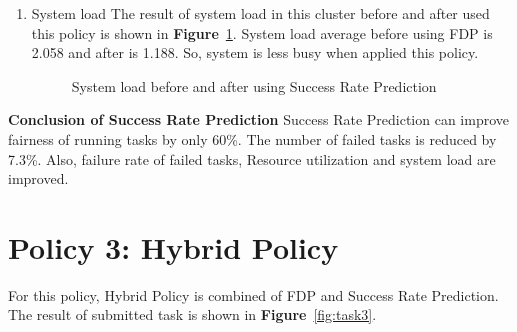 \documentclass[12pt,oneside,openright,a4paper]{cpe-english-project}
\begin{document}
\begin{enumerate}
\newpage
  \item System load
  \newline
  The result of system load in this cluster before and after used this policy is shown in \textbf{Figure}~\ref{fig:load2}. System load average before using FDP is 2.058 and after is 1.188. So, system is less busy when applied this policy.
\begin{figure}[!h]\centering
    \setlength{\fboxrule}{0mm} %
    \setlength{\fboxsep}{0cm}
    \caption{System load before and after using Success Rate Prediction}\label{fig:load2}
\end{figure}
\end{enumerate}
\textbf{Conclusion of Success Rate Prediction}
\newline
\hspace{10mm}Success Rate Prediction can improve fairness of running tasks by only 60\%. The number of failed tasks is reduced by 7.3\%. Also, failure rate of failed tasks, Resource utilization and system load are improved.


\section{Policy 3: Hybrid Policy}  
\hspace{10mm}For this policy, Hybrid Policy is combined of FDP and Success Rate Prediction. The result of submitted task is shown in  \textbf{Figure}~\ref{fig:task3}.
\end{document}
